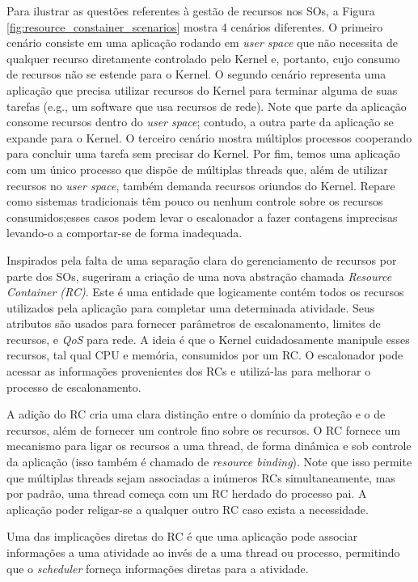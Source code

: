 Para ilustrar as questões referentes à gestão de recursos nos SOs, a Figura
\ref{fig:resource_constainer_scenarios} mostra 4 cenários diferentes. O
primeiro cenário consiste em uma aplicação rodando em \textit{user space} que
não necessita de qualquer recurso diretamente controlado pelo Kernel e,
portanto, cujo consumo de recursos não se estende para o Kernel. O segundo
cenário representa uma aplicação que precisa utilizar recursos do Kernel para
terminar alguma de suas tarefas (e.g., um software que usa recursos de rede).
Note que parte da aplicação consome recursos dentro do \textit{user space};
contudo, a outra parte da aplicação se expande para o Kernel. O terceiro cenário
mostra múltiplos processos cooperando para concluir uma tarefa sem precisar
do Kernel. Por fim, temos uma aplicação com um único processo que dispõe de
múltiplas threads que, além de utilizar recursos no \textit{user space}, também
demanda recursos oriundos do Kernel. Repare como sistemas tradicionais têm
pouco ou nenhum controle sobre os recursos consumidos;esses casos
podem levar o escalonador a fazer contagens imprecisas levando-o a
comportar-se de forma inadequada.

Inspirados pela falta de uma separação clara do gerenciamento de recursos por
parte dos SOs, \citet{resourcecontainers} sugeriram a criação de uma nova
abstração chamada \emph{Resource Container (RC)}. Este é uma entidade que
logicamente contém todos os recursos utilizados pela aplicação para completar
uma determinada atividade. Seus atributos são usados para fornecer parâmetros
de escalonamento, limites de recursos, e \emph{QoS} para rede. A ideia é que o
Kernel cuidadosamente manipule esses recursos, tal qual CPU e memória, consumidos
por um RC. O escalonador pode acessar as informações provenientes dos RCs e
utilizá-las para melhorar o processo de escalonamento.

A adição do RC cria uma clara distinção entre o domínio da proteção e o de
recursos, além de fornecer um controle fino sobre os recursos. O RC fornece um
mecanismo para ligar os recursos a uma thread, de forma
dinâmica e sob controle da aplicação (isso também é chamado de \emph{resource
binding}). Note que isso permite que múltiplas threads sejam associadas a
inúmeros RCs simultaneamente, mas por padrão, uma thread começa com um RC
herdado do processo pai. A aplicação poder religar-se a qualquer outro RC
caso exista a necessidade.

Uma das implicações diretas do RC é que uma aplicação pode associar informações a
uma atividade ao invés de a uma thread ou processo, permitindo que
o \emph{scheduler} forneça informações diretas para a atividade.

